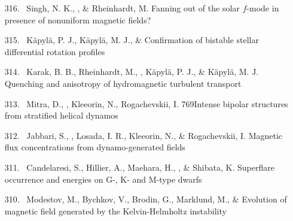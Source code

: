 \begin{itemize}
\item[{316.}~]
Singh, N. K., \Brandenburg, \& Rheinhardt, M.
{Fanning out of the solar $f$-mode in presence of nonuniform magnetic fields?}

\item[{315.}~]
K\"apyl\"a, P. J., K\"apyl\"a, M. J., \& \Brandenburg{}
{Confirmation of bistable stellar differential rotation profiles}

\item[{314.}~]
Karak, B. B., Rheinhardt, M., \Brandenburg, K\"apyl\"a, P. J., \& K\"apyl\"a, M. J.
{Quenching and anisotropy of hydromagnetic turbulent transport}

\item[{313.}~]
Mitra, D., \Brandenburg, Kleeorin, N., Rogachevskii, I.
{769}{Intense bipolar structures from stratified helical dynamos}

\item[{312.}~]
Jabbari, S., \Brandenburg, Losada, I. R., Kleeorin, N., \& Rogachevskii, I.
{Magnetic flux concentrations from dynamo-generated fields}

\item[{311.}~]
Candelaresi, S., Hillier, A., Maehara, H., \Brandenburg, \& Shibata, K.
{Superflare occurrence and energies on G-, K- and M-type dwarfs}

\item[{310.}~]
Modestov, M., Bychkov, V., Brodin, G., Marklund, M., \& \Brandenburg{}
{Evolution of magnetic field generated by the Kelvin-Helmholtz instability}


\end{itemize}
